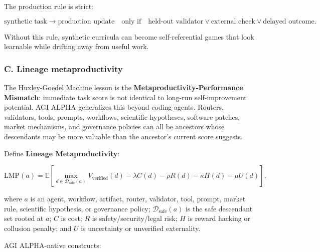 \documentclass[11pt]{article}
\begin{document}
The production rule is strict:

\[
\text{synthetic task} \rightarrow \text{production update}
\quad\text{only if}\quad
\text{held-out validator} \lor \text{external check} \lor \text{delayed outcome}.
\]

Without this rule, synthetic curricula can become self-referential games that look learnable while drifting away from useful work.

\subsubsection{C. Lineage metaproductivity}\label{c.-lineage-metaproductivity}

The Huxley-Goedel Machine lesson is the \textbf{Metaproductivity-Performance Mismatch}: immediate task score is not identical to long-run self-improvement potential. AGI ALPHA generalizes this beyond coding agents. Routers, validators, tools, prompts, workflows, scientific hypotheses, software patches, market mechanisms, and governance policies can all be ancestors whose descendants may be more valuable than the ancestor's current score suggests.

Define \textbf{Lineage Metaproductivity}:

\[
\mathrm{LMP}(a)=
\mathbb{E}\left[
\max_{d\in\mathcal{D}_{\mathrm{safe}}(a)}
V_{\mathrm{verified}}(d)
-\lambda C(d)
-\rho R(d)
-\kappa H(d)
-\mu U(d)
\right],
\]

where \(a\) is an agent, workflow, artifact, router, validator, tool, prompt, market rule, scientific hypothesis, or governance policy; \(\mathcal{D}_{\mathrm{safe}}(a)\) is the safe descendant set rooted at \(a\); \(C\) is cost; \(R\) is safety/security/legal risk; \(H\) is reward hacking or collusion penalty; and \(U\) is uncertainty or unverified externality.

AGI ALPHA-native constructs:
\end{document}
